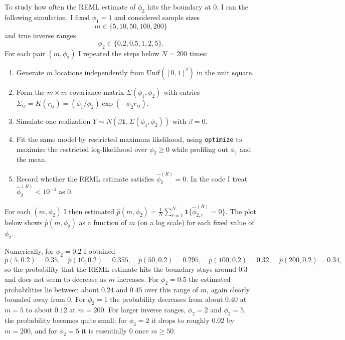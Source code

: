 \documentclass[answers,12pt,addpoints]{exam}
\begin{document}
\begin{questions}
\begin{solution}
To study how often the REML estimate of $\phi_2$ hits the boundary at
$0$, I ran the following simulation. I fixed $\phi_1 = 1$ and
considered sample sizes
\[
m \in \{5, 10, 50, 100, 200\}
\]
and true inverse ranges
\[
\phi_2 \in \{0.2, 0.5, 1, 2, 5\}.
\]
For each pair $(m,\phi_2)$ I repeated the steps below $N = 200$ times:
\begin{enumerate}
\item Generate $m$ locations independently from $\mathrm{Unif}([0,1]^2)$
      in the unit square.
\item Form the $m\times m$ covariance matrix $\Sigma(\phi_1,\phi_2)$
      with entries
      $\Sigma_{ij} = K(r_{ij})
      = (\phi_1/\phi_2)\exp(-\phi_2 r_{ij})$.
\item Simulate one realization
      $Y \sim N(\beta\mathbf{1},\Sigma(\phi_1,\phi_2))$ with $\beta=0$.
\item Fit the same model by restricted maximum likelihood, using
      \texttt{optimize} to maximize the restricted log-likelihood over
      $\phi_2 \ge 0$ while profiling out $\phi_1$ and the mean.
\item Record whether the REML estimate satisfies
      $\hat\phi_2^{(R)} = 0$. In the code I treat
      $\hat\phi_2^{(R)} < 10^{-4}$ as $0$.
\end{enumerate}

For each $(m,\phi_2)$ I then estimated
$
\hat p(m,\phi_2)
= \frac{1}{N} \sum_{r=1}^N
  \mathbf{1}\{\hat\phi_{2,r}^{(R)} = 0\}.
$
The plot below shows $\hat p(m,\phi_2)$ as a function of $m$ (on a log
scale) for each fixed value of $\phi_2$.

Numerically, for $\phi_2 = 0.2$ I obtained
\[
\hat p(5,0.2) = 0.35,\quad
\hat p(10,0.2) = 0.355,\quad
\hat p(50,0.2) = 0.295,\quad
\hat p(100,0.2) = 0.32,\quad
\hat p(200,0.2) = 0.34,
\]
so the probability that the REML estimate hits the boundary stays
around $0.3$ and does not seem to decrease as $m$ increases. For
$\phi_2 = 0.5$ the estimated probabilities lie between about $0.24$
and $0.45$ over this range of $m$, again clearly bounded away from $0$.
For $\phi_2 = 1$ the probability decreases from about $0.40$ at $m=5$
to about $0.12$ at $m=200$. For larger inverse ranges,
$\phi_2 = 2$ and $\phi_2 = 5$, the probability becomes quite small:
for $\phi_2 = 2$ it drops to roughly $0.02$ by $m=200$, and for
$\phi_2 = 5$ it is essentially $0$ once $m \ge 50$.


\end{solution}
\end{questions}
\end{document}
